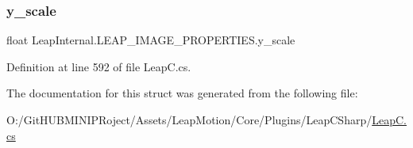 \subsubsection{\texorpdfstring{y\_scale}{y\_scale}}
{\footnotesize\ttfamily float Leap\+Internal.\+L\+E\+A\+P\+\_\+\+I\+M\+A\+G\+E\+\_\+\+P\+R\+O\+P\+E\+R\+T\+I\+E\+S.\+y\+\_\+scale}



Definition at line 592 of file Leap\+C.\+cs.



The documentation for this struct was generated from the following file\+:\begin{DoxyCompactItemize}
\item 
O\+:/\+Git\+H\+U\+B\+M\+I\+N\+I\+P\+Roject/\+Assets/\+Leap\+Motion/\+Core/\+Plugins/\+Leap\+C\+Sharp/\mbox{\hyperlink{_leap_c_8cs}{Leap\+C.\+cs}}\end{DoxyCompactItemize}
